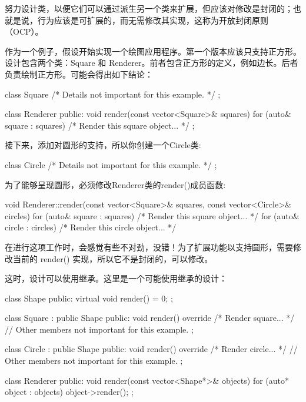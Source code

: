 努力设计类，以便它们可以通过派生另一个类来扩展，但应该对修改是封闭的；也就是说，行为应该是可扩展的，而无需修改其实现，这称为开放封闭原则（OCP）。

作为一个例子，假设开始实现一个绘图应用程序。第一个版本应该只支持正方形。设计包含两个类：Square 和 Renderer。前者包含正方形的定义，例如边长。后者负责绘制正方形。可能会得出如下结论：

\begin{cpp}
class Square { /* Details not important for this example. */ };

class Renderer
{
    public:
    void render(const vector<Square>& squares)
    {
        for (auto& square : squares) { /* Render this square object... */ }
    }
};
\end{cpp}

接下来，添加对圆形的支持，所以你创建一个Circle类:

\begin{cpp}
class Circle { /* Details not important for this example. */ };
\end{cpp}

为了能够呈现圆形，必须修改Renderer类的render()成员函数:

\begin{cpp}
void Renderer::render(const vector<Square>& squares,
    const vector<Circle>& circles)
{
    for (auto& square : squares) { /* Render this square object... */ }
    for (auto& circle : circles) { /* Render this circle object... */ }
}
\end{cpp}

在进行这项工作时，会感觉有些不对劲，没错！为了扩展功能以支持圆形，需要修改当前的 render() 实现，所以它不是封闭的，可以修改。

这时，设计可以使用继承。这里是一个可能使用继承的设计：

\begin{cpp}
class Shape
{
    public:
    virtual void render() = 0;
};

class Square : public Shape
{
    public:
    void render() override { /* Render square... */ }
    // Other members not important for this example.
};

class Circle : public Shape
{
    public:
    void render() override { /* Render circle... */ }
    // Other members not important for this example.
};

class Renderer
{
    public:
    void render(const vector<Shape*>& objects)
    {
        for (auto* object : objects) { object->render(); }
    }
};
\end{cpp}

